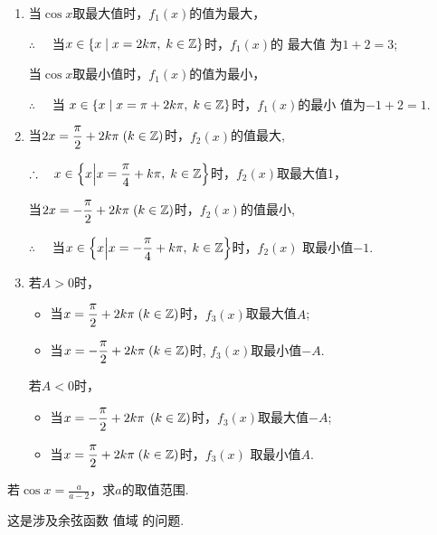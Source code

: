 \begin{solution}
\begin{enumerate}[(1)]
    \item 当$\cos x$取最大值时，$f_1(x)$的值为最大，

$\therefore\quad$ 当$x \in \{ x\mid x= 2k\pi, \; k\in \mathbb{Z}\}$时，$f_1(x)$的 最大值
为$1+2=3$;

当$\cos x$取最小值时，$f_1(x)$的值为最小，

$\therefore\quad $ 当 $x\in \{ x\mid x= \pi + 2k\pi,\; k\in \mathbb{Z}\}$时，$f_1(x)$的最小
值为$-1+2=1$.

\item 当$2x=\dfrac{\pi}{2}+2k\pi\; (k\in \mathbb{Z})$时，$f_{2}(x)$的值最大,

$\therefore\quad x\in \left\{ x\Big|  x= \dfrac \pi 4+ k\pi,\; k\in \mathbb{Z}\right\}$时，$f_2(x)$取最大值1， 

当$2x=-\dfrac{\pi}{2}+2k\pi\; (k\in \mathbb{Z})$时，$f_2(x)$的值最小,

$\therefore\quad$ 当$x\in \left\{ x\Big| x= - \dfrac \pi 4+ k\pi,\;  k\in \mathbb{Z}\right\}$时，$f_{2}( x)$ 取最小值$-1$.
\item  若$A>0$时，
\begin{itemize}
    \item 当$x=\dfrac{\pi}{2}+2k\pi\; (k\in \mathbb{Z})$时，$f_{3}(x)$取最大值$A$;
    \item 当$x=-\dfrac{\pi}{2}+2k\pi\; (k\in \mathbb{Z})$时, $f_3(x)$取最小值$-A$.
\end{itemize}

若$A<0$时，
\begin{itemize}
    \item 当$x=-\dfrac{\pi}{2}+2k\pi\; \left(k\in \mathbb{Z}\right)$时，$f_{3}(x)$取最大值$-A$;
    \item 当$x=\dfrac{\pi}{2}+2k\pi\; (k\in \mathbb{Z})$时，$f_3(x)$ 取最小值$A$.
\end{itemize}
\end{enumerate}
\end{solution}

\begin{example}
    若$\cos x=\frac{a}{a-2}$，求$a$的取值范围.
\end{example}

\begin{analyze}
这是涉及余弦函数 值域 的问题.
\end{analyze}

